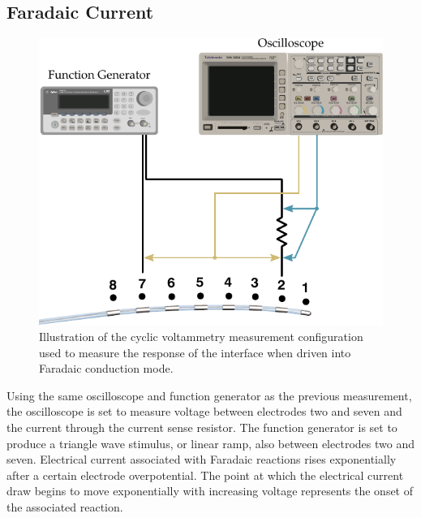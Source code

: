     \subsection{Faradaic Current}
      \begin{figure}
        \centering
        \includegraphics{content/pt2/08-InterfaceParameters/graphics/measurement_Faradaic_setup_initial}
        \caption{\label{fig:pt2-measurement_Faradaic_setup_initial}Illustration of the cyclic voltammetry measurement configuration used to measure the response of the interface when driven into Faradaic conduction mode.}
      \end{figure}
      Using the same oscilloscope and function generator as the previous measurement, the oscilloscope is set to measure voltage between electrodes two and seven and the current through the current sense resistor.
      The function generator is set to produce a triangle wave stimulus, or linear ramp, also between electrodes two and seven.
      Electrical current associated with Faradaic reactions rises exponentially after a certain electrode overpotential.
      The point at which the electrical current draw begins to move exponentially with increasing voltage represents the onset of the associated reaction.
